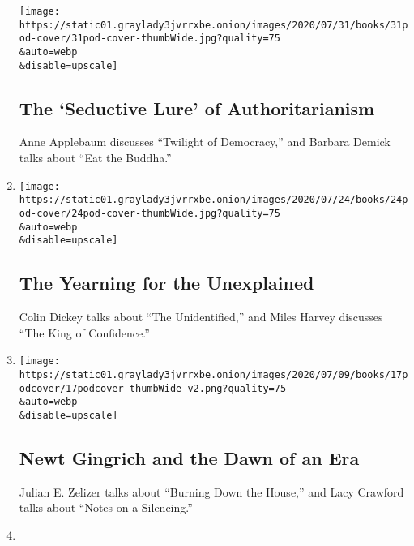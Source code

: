 \begin{enumerate}
  \texttt{[image: https://static01.graylady3jvrrxbe.onion/images/2020/07/31/books/31pod-cover/31pod-cover-thumbWide.jpg?quality=75\\\&auto=webp\\\&disable=upscale]}

  \hypertarget{the-seductive-lure-of-authoritarianism}{%
  \subsection{The `Seductive Lure' of
  Authoritarianism}\label{the-seductive-lure-of-authoritarianism}}

  Anne Applebaum discusses ``Twilight of Democracy,'' and Barbara Demick
  talks about ``Eat the Buddha.''
\item
  \href{/2020/07/24/books/review/podcast-colin-dickey-unexplained-miles-harvey-king-of-confidence.html}{}

  \texttt{[image: https://static01.graylady3jvrrxbe.onion/images/2020/07/24/books/24pod-cover/24pod-cover-thumbWide.jpg?quality=75\\\&auto=webp\\\&disable=upscale]}

  \hypertarget{the-yearning-for-the-unexplained}{%
  \subsection{The Yearning for the
  Unexplained}\label{the-yearning-for-the-unexplained}}

  Colin Dickey talks about ``The Unidentified,'' and Miles Harvey
  discusses ``The King of Confidence.''
\item
  \href{/2020/07/17/books/review/podcast-julian-zelizer-burning-down-house-newt-gingrich-notes-silencing-lacy-crawford.html}{}

  \texttt{[image: https://static01.graylady3jvrrxbe.onion/images/2020/07/09/books/17podcover/17podcover-thumbWide-v2.png?quality=75\\\&auto=webp\\\&disable=upscale]}

  \hypertarget{newt-gingrich-and-the-dawn-of-an-era}{%
  \subsection{Newt Gingrich and the Dawn of an
  Era}\label{newt-gingrich-and-the-dawn-of-an-era}}

  Julian E. Zelizer talks about ``Burning Down the House,'' and Lacy
  Crawford talks about ``Notes on a Silencing.''
\item
  \href{/2020/07/10/books/review/david-mitchell-utopia-avenue-daniel-mendelsohn-biggest-bluff-poker-maria-konnikova.html}{}


\end{enumerate}
